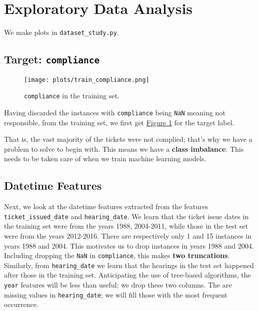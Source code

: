 \documentclass[12pt,letterpaper]{article}
\numberwithin{equation}{section}
\begin{document}
\section{Exploratory Data Analysis}

We make plots in \verb|dataset_study.py|.

\subsection{Target: \texttt{compliance}}


\vspace*{-12pt}

\begin{figure}[H]
\begin{center}
\texttt{[image: plots/train\_compliance.png]}
\caption{\texttt{compliance} in the training set.}\label{compliance}
\end{center}
\end{figure}

Having discarded the instances with \verb|compliance| being \verb|NaN| meaning not responsible, from the training set, we first get \hyperref[compliance]{Figure \ref*{compliance}} for the target label.

That is, the vast majority of the tickets were not complied; that's why we have a problem to solve to begin with. This means we have a \textbf{class imbalance}. This needs to be taken care of when we train machine learning models.

\subsection{Datetime Features}

Next, we look at the datetime features extracted from the features \verb|ticket_issued_date| and \verb|hearing_date|. We learn that the ticket issue dates in the training set were from the years 1988, 2004-2011, while those in the test set were from the years 2012-2016. There are respectively only 1 and 15 instances in years 1988 and 2004. This motivates us to drop instances in years 1988 and 2004. Including dropping the \verb|NaN| in \verb|compliance|, this makes \textbf{two truncations}. Similarly, from \verb|hearing_date| we learn that the hearings in the test set happened after those in the training set. Anticipating the use of tree-based algorithms, the \verb|year| features will be less than useful; we drop these two columns. The are missing values in \verb|hearing_date|; we will fill those with the most frequent occurrence.
\end{document}
